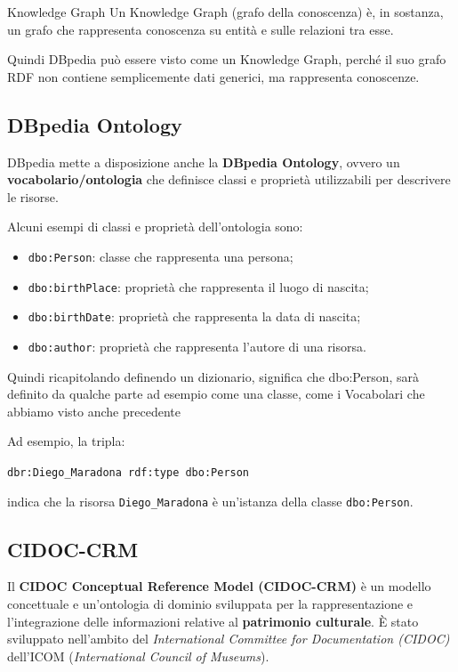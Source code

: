 \begin{definition}{Knowledge Graph}
    Un Knowledge Graph (grafo della conoscenza) è, in sostanza, un grafo che rappresenta conoscenza su entità e sulle relazioni tra esse.
\end{definition}

Quindi DBpedia può essere visto come un Knowledge Graph, perché il suo grafo RDF non contiene semplicemente dati generici, ma rappresenta conoscenze.


\subsection{DBpedia Ontology}

DBpedia mette a disposizione anche la \textbf{DBpedia Ontology}, ovvero un \textbf{vocabolario/ontologia} che definisce classi e proprietà utilizzabili per descrivere le risorse.

Alcuni esempi di classi e proprietà dell'ontologia sono:

\begin{itemize}
\item \texttt{dbo:Person}: classe che rappresenta una persona;
\item \texttt{dbo:birthPlace}: proprietà che rappresenta il luogo di nascita;
\item \texttt{dbo:birthDate}: proprietà che rappresenta la data di nascita;
\item \texttt{dbo:author}: proprietà che rappresenta l'autore di una risorsa.
\end{itemize}

Quindi ricapitolando definendo un dizionario, significa che dbo:Person, sarà definito da qualche parte ad esempio come una classe, come i Vocabolari che abbiamo visto anche precedente

Ad esempio, la tripla:

\begin{center}
\texttt{dbr:Diego\_Maradona \quad rdf:type \quad dbo:Person}
\end{center}

indica che la risorsa \texttt{Diego\_Maradona} è un'istanza della classe \texttt{dbo:Person}.

\subsection{CIDOC-CRM}

Il \textbf{CIDOC Conceptual Reference Model (CIDOC-CRM)} è un modello
concettuale e un'ontologia di dominio sviluppata per la rappresentazione
e l'integrazione delle informazioni relative al \textbf{patrimonio
culturale}. È stato sviluppato nell'ambito del \textit{International
Committee for Documentation (CIDOC)} dell'ICOM
(\textit{International Council of Museums}).

